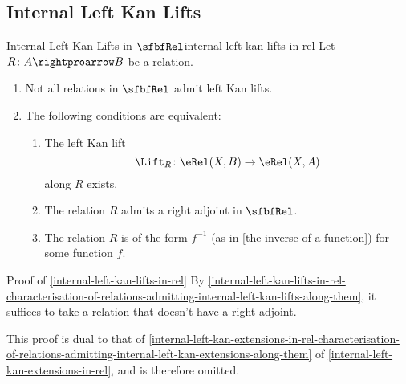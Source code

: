 \subsection{Internal Left Kan Lifts}\label{subsection-internal-left-kan-lifts-in-rel}
\begin{proposition}{Internal Left Kan Lifts in $\sfbfRel$}{internal-left-kan-lifts-in-rel}%
    Let $R\colon A\rightproarrow B$ be a relation.
    \begin{enumerate}
        \item\label{internal-left-kan-lifts-in-rel-non-existence-of-all-internal-left-kan-lifts-in-rel}Not all relations in $\sfbfRel$ admit left Kan lifts.
        \item\label{internal-left-kan-lifts-in-rel-characterisation-of-relations-admitting-internal-left-kan-lifts-along-them}The following conditions are equivalent:
            \begin{enumerate}
                \item\label{internal-left-kan-lifts-in-rel-characterisation-of-relations-admitting-internal-left-kan-lifts-along-them-1}The left Kan lift
                    \[
                        \Lift_{R}%
                        \colon%
                        \eRel(X,B)%
                        \to%
                        \eRel(X,A)%
                    \]%
                    along $R$ exists.
                \item\label{internal-left-kan-lifts-in-rel-characterisation-of-relations-admitting-internal-left-kan-lifts-along-them-2}The relation $R$ admits a right adjoint in $\sfbfRel$.
                \item\label{internal-left-kan-lifts-in-rel-characterisation-of-relations-admitting-internal-left-kan-lifts-along-them-3}The relation $R$ is of the form $f^{-1}$ (as in \cref{the-inverse-of-a-function}) for some function $f$.
            \end{enumerate}
    \end{enumerate}
\end{proposition}
\begin{Proof}{Proof of \cref{internal-left-kan-lifts-in-rel}}%
    By \cref{internal-left-kan-lifts-in-rel-characterisation-of-relations-admitting-internal-left-kan-lifts-along-them}, it suffices to take a relation that doesn't have a right adjoint.

    This proof is dual to that of \cref{internal-left-kan-extensions-in-rel-characterisation-of-relations-admitting-internal-left-kan-extensions-along-them} of \cref{internal-left-kan-extensions-in-rel}, and is therefore omitted.
\end{Proof}
